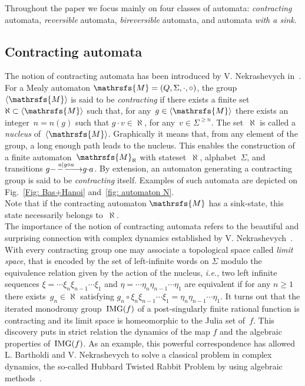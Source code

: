 \documentclass{amsart}
\begin{document}
Throughout the paper we focus mainly on four classes of automata: \emph{contracting} automata, \emph{reversible}  automata, \emph{bireversible}  automata, and automata \emph{with a sink}.

\subsection{Contracting automata}
The notion of contracting automata has been introduced by V. Nekrashevych in~\cite{Nekra05}. For a Mealy automaton ${{{\mathrsfs{{M}}}}}=({{{Q}}},{{{\Sigma}}},{{{\cdot}}},{{{\circ}}})$, the group~${{{\langle}{{\mathrsfs{{{M}}}}}{\rangle}}}$ is said to be \emph{contracting} if there exists a finite set~${{{\aleph}}}\subset{{{\langle}{{\mathrsfs{{{M}}}}}{\rangle}}}$ such that, for any~$g\in{{{\langle}{{\mathrsfs{{{M}}}}}{\rangle}}}$ there exists an integer~$n=n(g)$ such that $g{{{\cdot}}} v\in {{{\aleph}}}$, for any~$v\in {{{\Sigma}}}^{\geq n}$. The set~${{{\aleph}}}$ is called a \emph{nucleus} of~${{{\langle}{{\mathrsfs{{{M}}}}}{\rangle}}}$. Graphically it means that, from any element of the group, a long enough path leads to the nucleus. This enables the construction of a finite automaton~${{{\mathrsfs{{M}}}}}_{{{\aleph}}}$ with stateset~${{{\aleph}}}$,  alphabet~${{{\Sigma}}}$, and transitions $g{\smash{\mathop{\relbar\joinrel{\relbar\joinrel{\relbar\joinrel\longrightarrow}}}\limits^{{a|g{{{\circ}}} a}}}}g{{{\cdot}}} a$. By extension, an automaton generating a contracting group is said to be \emph{contracting} itself. Examples of such automata are depicted on Fig.~\ref{Fig: Bas+Hanoi} and~\ref{fig: automaton N}.\\
 Note that if the contracting automaton ${{{\mathrsfs{{M}}}}}$ has a sink-state, this state necessarily belongs to~${{{\aleph}}}$.\\
The importance of the notion of contracting automata  refers to the beautiful and surprising connection with complex dynamics established by V. Nekrashevych~\cite{Nekra05}.\\
  With every contracting group one may associate a topological space called \emph{limit space}, that is encoded by the set of left-infinite words on ${{{\Sigma}}}$ modulo the equivalence relation given by the action of the nucleus, \emph{i.e.}, two left infinite sequences $\xi=\cdots\xi_n\xi_{n-1}\cdots\xi_1$ and $\eta=\cdots\eta_n\eta_{n-1}\cdots\eta_1$ are equivalent if for any $n\geq 1$ there exists~$g_n\in {{{\aleph}}}$ satisfying $g_n{{{\circ}}} \xi_n\xi_{n-1}\cdots\xi_1=\eta_n\eta_{n-1}\cdots\eta_1$. It turns out that the iterated monodromy group~$\operatorname{\hbox{IMG}}(f)$ of a post-singularly finite rational function is contracting and its limit space is homeomorphic to the Julia set of~$f$. This discovery puts in strict relation the dynamics of the map $f$ and the algebraic properties of~$\operatorname{\hbox{IMG}}(f)$. As an example, this powerful correspondence has allowed L. Bartholdi and V. Nekrashevych to solve a classical problem in complex dynamics, the so-called Hubbard Twisted Rabbit Problem by using algebraic methods~\cite{BaNe06}.
\end{document}
